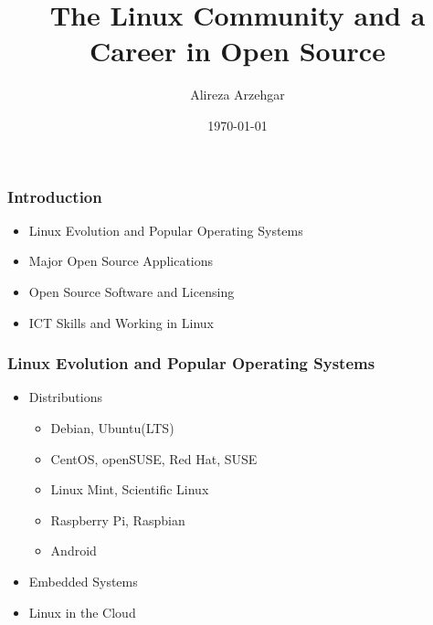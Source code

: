 \documentclass{beamer}
\author{Alireza Arzehgar}
\title{The Linux Community and a Career in Open Source}
\date{\today}
\begin{document}
	\begin{frame}[plain]
		\maketitle
	\end{frame}

	\begin{frame}
		\frametitle{Introduction}
		\begin{itemize}
			\pause
			\item Linux Evolution and Popular Operating Systems
			\pause
			\item Major Open Source Applications
			\pause
			\item Open Source Software and Licensing 
			\pause
			\item ICT Skills and Working in Linux
		\end{itemize}
	\end{frame}

	\begin{frame}
		\frametitle{Linux Evolution and Popular Operating Systems}
		\begin{itemize}
			\pause
			\item Distributions
			\begin{itemize}
				\pause
				\item Debian, Ubuntu(LTS)
				\pause
				\item CentOS, openSUSE, Red Hat, SUSE
				\pause
				\item Linux Mint, Scientific Linux
				\pause
				\item Raspberry Pi, Raspbian
				\pause
				\item Android
			\end{itemize}
			\pause
			\item Embedded Systems
			\pause
			\item Linux in the Cloud
		\end{itemize}
	\end{frame}
\end{document}
